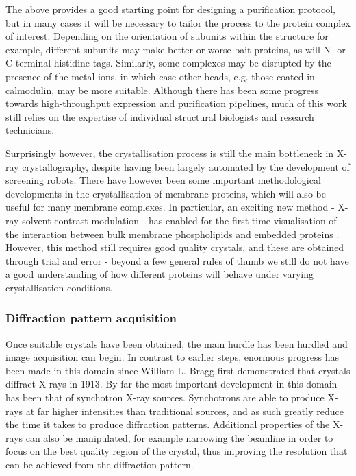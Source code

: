 \documentclass[a4paper,11pt,twoside,openright]{scrbook}
\begin{document}
The above provides a good starting point for designing a purification protocol, but in many cases it will be necessary to tailor the process to the protein complex of interest. Depending on the orientation of subunits within the structure for example, different subunits may make better or worse bait proteins, as will N- or C-terminal histidine tags. Similarly, some complexes may be disrupted by the presence of the metal ions, in which case other beads, e.g. those coated in calmodulin, may be more suitable. Although there has been some progress towards high-throughput expression and purification pipelines, much of this work still relies on the expertise of individual structural biologists and research technicians.

Surprisingly however, the crystallisation process is still the main bottleneck in X-ray crystallography, despite having been largely automated by the development of screening robots. There have however been some important methodological developments in the crystallisation of membrane proteins, which will also be useful for many membrane complexes. In particular, an exciting new method - X-ray solvent contrast modulation - has enabled for the first time visualisation of the interaction between bulk membrane phospholipids and embedded proteins \cite{Norimatsu2017}. However, this method still requires good quality crystals, and these are obtained through trial and error - beyond a few general rules of thumb we still do not have a good understanding of how different proteins will behave under varying crystallisation conditions.



\subsubsection{Diffraction pattern acquisition}
Once suitable crystals have been obtained, the main hurdle has been hurdled and image acquisition can begin. In contrast to earlier steps, enormous progress has been made in this domain since William L. Bragg first demonstrated that crystals diffract X-rays in 1913. By far the most important development in this domain has been that of synchotron X-ray sources. Synchotrons are able to produce X-rays at far higher intensities than traditional sources, and as such greatly reduce the time it takes to produce diffraction patterns. Additional properties of the X-rays can also be manipulated, for example narrowing the beamline in order to focus on the best quality region of the crystal, thus improving the resolution that can be achieved from the diffraction pattern.
\end{document}
